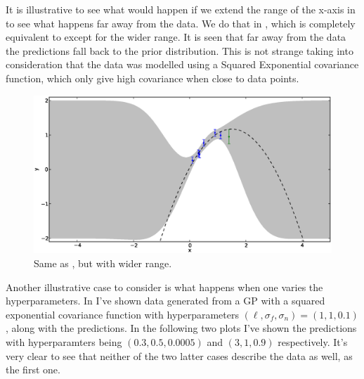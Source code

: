 \documentclass[a4paper,11pt,article,oneside]{memoir}
\begin{document}
It is illustrative to see what would happen if we extend the range of the x-axis in  to see what happens far away from the data. We do that in , which is completely equivalent to  except for the wider range. It is seen that far away from the data the predictions fall back to the prior distribution. This is not strange taking into consideration that the data was modelled using a Squared Exponential covariance function, which only give high covariance when close to data points.

\begin{figure}[htb]
\centering
\includegraphics[width=\textwidth]{fig5}
\caption{Same as , but with wider range.}
\label{fig:test1}
\end{figure}

Another illustrative case to consider is what happens when one varies the hyperparameters. In  I've shown data generated from a GP with a squared exponential covariance function with hyperparameters $(\ell,\sigma_f,\sigma_n)=(1,1,0.1)$, along with the predictions. In the following two plots I've shown the predictions with hyperparamters being $(0.3,0.5,0.0005)$ and $(3,1,0.9)$ respectively. It's very clear to see that neither of the two latter cases describe the data as well, as the first one.
\end{document}
